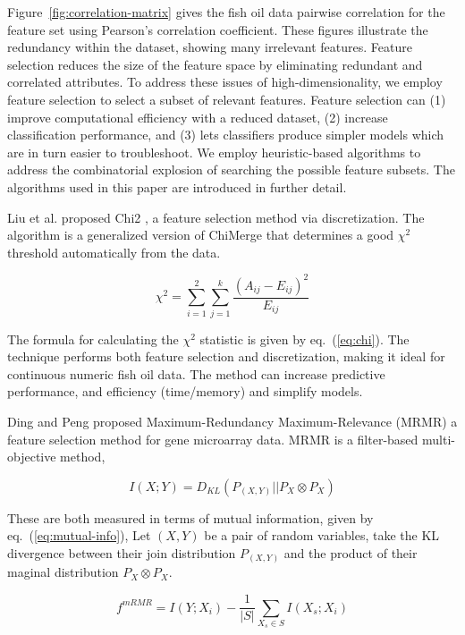 \documentclass[runningheads]{llncs}
\begin{document}
Figure~\ref{fig:correlation-matrix} gives the fish oil data pairwise correlation for the feature set using Pearson's correlation coefficient.
These figures illustrate the redundancy within the dataset, showing many irrelevant features. 
Feature selection reduces the size of the feature space by eliminating redundant and correlated attributes. 
To address these issues of high-dimensionality, we employ feature selection to select a subset of relevant features. 
Feature selection can (1) improve computational efficiency with a reduced dataset, (2) increase classification performance, and (3) lets classifiers produce simpler models which are in turn easier to troubleshoot.
We employ heuristic-based algorithms to address the combinatorial explosion of searching the possible feature subsets.
The algorithms used in this paper are introduced in further detail.

Liu et al. proposed Chi2 \cite{liu1995chi2}, a feature selection method via discretization. 
The algorithm is a generalized version of ChiMerge \cite{kerber1992chimerge} that determines a good $\chi^2$ threshold automatically from the data.

\begin{equation}
  \chi^2 = \sum_{i=1}^2 \sum_{j=1}^k \frac{(A_{ij} - E_{ij})^2}{E_{ij}}
  \label{eq:chi}
\end{equation}

The formula for calculating the $\chi^2$ statistic is given by eq.~(\ref{eq:chi}).
The technique performs both feature selection and discretization, making it ideal for continuous numeric fish oil data. 
The method can increase predictive performance, and efficiency (time/memory) and simplify models. 

Ding and Peng proposed Maximum-Redundancy Maximum-Relevance (MRMR) \cite{ding2005minimum} a feature selection method for gene microarray data. 
MRMR is a filter-based multi-objective method, 

\begin{equation}
  I(X;Y) = D_{KL}(P_{(X,Y)} || P_X \otimes P_X) 
  \label{eq:mutual-info}
\end{equation}  

These are both measured in terms of mutual information, given by eq.~(\ref{eq:mutual-info}), 
Let $(X,Y)$ be a pair of random variables, take the KL divergence \cite{kullback1951information} between their join distribution $P_{(X,Y)}$ and the product of their maginal distribution $P_X \otimes P_X$.

\begin{equation}
  f^{mRMR} = I(Y;X_i) - \frac{1}{|S|} \sum_{X_s \in S} I(X_s;X_i) 
  \label{eq:mrmr}
\end{equation}  
\end{document}
